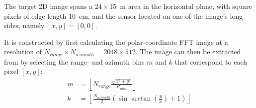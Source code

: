 The target 2D image spans a $24 \times$\SI{15}{\m} area in the horizontal plane,
with square pixels of edge length \SI{10}{\cm},
and the sensor located on one of the image's long sides, namely $[x,y] = [0,0]$.

It is constructed by first calculating the polar-coordinate FFT image at a resolution of $N_{range}\times N_{azimuth} = 2048 \times 512$.
The image can then be extracted from by selecting the range- and azimuth bins $m$ and $k$ that correspond to each pixel $[x,y]$:
\begin{align}
    m &= \left\lfloor N_{range} \frac{\sqrt{x^2 + y^2} }{R_{max}} \right\rfloor \\
    k &= \left\lfloor \frac{N_{azimuth}}{2} \left(\sin\arctan\left(\frac{y}{x}\right)+1\right) \right\rfloor
\end{align}

